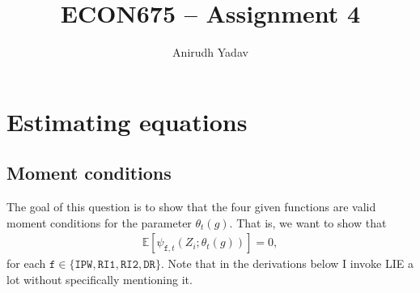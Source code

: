 \documentclass[12pt]{article}
\title{ECON675 -- Assignment 4}
\author{Anirudh Yadav}
\newcommand{\E}{\mathbb{E}}
\newcommand{\mtx}[1]{\ensuremath{\bm{\mathit{#1}}}}
\begin{document}
\maketitle

\setcounter{tocdepth}{2}
\tableofcontents

\newpage

\section{Estimating equations}

\subsection{Moment conditions}
The goal of this question is to show that the four given functions are valid moment conditions for the parameter $\theta_t(g)$. That is, we want to show that 
\begin{align*}
\E[\psi_{\texttt{f},t}(\mtx{Z}_i; \theta_t(g))] = 0,
\end{align*}
for each $\texttt{f} \in \{\texttt{IPW},\texttt{RI1},\texttt{RI2}, \texttt{DR}\}$. Note that in the derivations below I invoke LIE a lot without specifically mentioning it.\\
\end{document}
